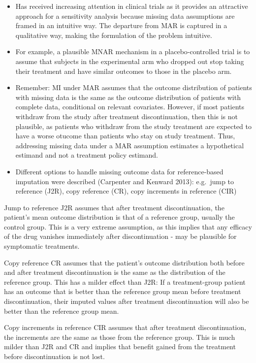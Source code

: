 \documentclass[
  letterpaper,
  DIV=11,
  numbers=noendperiod]{scrreprt}
\providecommand{\tightlist}{%
  \setlength{\itemsep}{0pt}\setlength{\parskip}{0pt}}\usepackage{longtable,booktabs,array}
\begin{document}
\begin{itemize}
\tightlist
\item
  Has received increasing attention in clinical trials as it provides an
  attractive approach for a sensitivity analysis because missing data
  assumptions are framed in an intuitive way. The departure from MAR is
  captured in a qualitative way, making the formulation of the problem
  intuitive.
\item
  For example, a plausible MNAR mechanism in a placebo‐controlled trial
  is to assume that subjects in the experimental arm who dropped out
  stop taking their treatment and have similar outcomes to those in the
  placebo arm.
\item
  Remember: MI under MAR assumes that the outcome distribution of
  patients with missing data is the same as the outcome distribution of
  patients with complete data, conditional on relevant covariates.
  However, if most patients withdraw from the study after treatment
  discontinuation, then this is not plausible, as patients who withdraw
  from the study treatment are expected to have a worse otucome than
  patients who stay on study treatment. Thus, addressing missing data
  under a MAR assumption estimates a hypothetical estimand and not a
  treatment policy estimand.
\item
  Different options to handle missing outcome data for reference-based
  imputation were described (Carpenter and Kenward 2013): e.g.~jump to
  reference (J2R), copy reference (CR), copy increments in reference
  (CIR)
\end{itemize}

Jump to reference J2R assumes that after treatment discontinuation, the
patient's mean outcome distribution is that of a reference group,
usually the control group. This is a very extreme assumption, as this
implies that any efficacy of the drug vanishes immediately after
discontinuation - may be plausible for symptomatic treatments.

Copy reference CR assumes that the patient's outcome distribution both
before and after treatment discontinuation is the same as the
distribution of the reference group. This has a milder effect than J2R:
If a treatment-group patient has an outcome that is better than the
reference group mean before treatment discontinuation, their imputed
values after treatment discontinuation will also be better than the
reference group mean.

Copy increments in reference CIR assumes that after treatment
discontinuation, the increments are the same as those from the reference
group. This is much milder than J2R and CR and implies that benefit
gained from the treatment before discontinuation is not lost.
\end{document}
